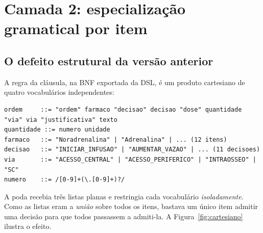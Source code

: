 \documentclass[11pt,a4paper]{article}
\begin{document}
\section{Camada 2: especialização gramatical por item}
\label{sec:especializacao}

\subsection{O defeito estrutural da versão anterior}

A regra da cláusula, na BNF exportada da DSL, é um produto cartesiano de quatro
vocabulários independentes:

\begin{lstlisting}[language=bnf,caption={Regra da cláusula em $G$ (domínio clínico), antes da revisão.}]
ordem     ::= "ordem" farmaco "decisao" decisao "dose" quantidade "via" via "justificativa" texto
quantidade ::= numero unidade
farmaco   ::= "Noradrenalina" | "Adrenalina" | ... (12 itens)
decisao   ::= "INICIAR_INFUSAO" | "AUMENTAR_VAZAO" | ... (11 decisoes)
via       ::= "ACESSO_CENTRAL" | "ACESSO_PERIFERICO" | "INTRAOSSEO" | "SC"
numero    ::= /[0-9]+(\.[0-9]+)?/
\end{lstlisting}

A poda recebia três listas planas e restringia cada vocabulário
\emph{isoladamente}. Como as listas eram a \emph{união} sobre todos os itens,
bastava um único item admitir uma decisão para que todos passassem a admiti-la.
A Figura~\ref{fig:cartesiano} ilustra o efeito.
\end{document}
